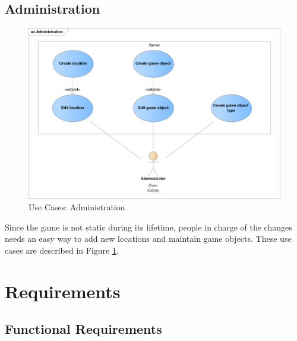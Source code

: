 	\subsection{Administration}
	\begin{figure}[h]	
		\includegraphics[width=\textwidth]{figures/UC_Administration}
		\centering			
		\caption{Use Cases: Administration}
		\label{fig:ucadmin}				
	\end{figure}	
	\noindent Since the game is not static during its lifetime, people in charge of the changes needs an easy way to add new locations and maintain game objects. These use cases are described in Figure \ref{fig:ucadmin}.
	
	
\section{Requirements}

	\subsection{Functional Requirements}
